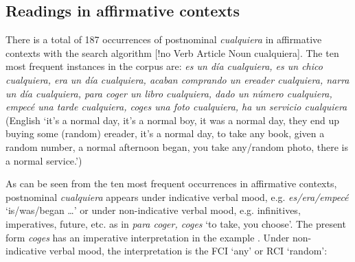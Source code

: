 
\subsection{{Readings} {in} {affirmative} {contexts}} \label{sec:3.2.1}

{There is a total of 187 occurrences of postnominal \textit{cualquiera} in affirmative contexts with the search algorithm [!no Verb Article Noun cualquiera]. The ten most frequent instances in the corpus are: \textit {es un día cualquiera, es un chico cualquiera, era un día cualquiera, acaban comprando un ereader cualquiera, narra un día cualquiera, para coger un libro cualquiera, dado un número cualquiera, empecé una tarde cualquiera, coges una foto cualquiera, ha un servicio cualquiera} (English {‘it's a normal day, it's a normal boy, it was a normal day, they end up buying some (random) ereader, it's a normal day, to take any book, given a random number, a normal afternoon began, you take any/random photo, there is a normal service.’})}

As can be seen from the ten most frequent occurrences in affirmative contexts, postnominal \textit{cualquiera} appears under indicative verbal mood, e.g. \textit{es/era/empecé} ‘is/was/began …’ or under non-indicative verbal mood, e.g. infinitives, imperatives, future, etc. as in \textit{para coger, coges} ‘to take, you choose’. The present form \textit{coges} has an imperative interpretation in the example . Under non-indicative verbal mood, the interpretation is the FCI ‘any’ or RCI ‘random’:

\ea \label{ex:key:Leéis} %
    
